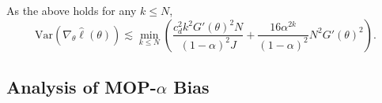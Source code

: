 \documentclass{article}
\begin{document}
As the above holds for any $k \leq N$,
$$\text{Var}(\nabla_\theta \hat\ell(\theta)) \lesssim \min_{k\leq N} \left(\frac{c_d^2k^2G'(\theta)^2N}{(1-\alpha)^2J} + \frac{16\alpha^{2k}}{(1-\alpha)^2}N^2G'(\theta)^2 \right).$$




\subsection{Analysis of MOP-$\alpha$ Bias}
\end{document}
